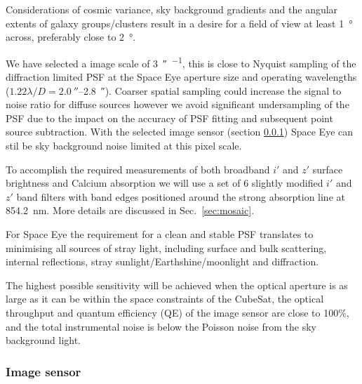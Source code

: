\documentclass[]{iac}
\begin{document}
Considerations of cosmic variance, sky background gradients and the angular extents of galaxy groups/clusters result in
a desire for a field of view at least \SI{1}{\degree} across, preferably close to \SI{2}{\degree}.

We have selected a image scale of \SI{3}{\arcsecond\per\pix}, this is close to Nyquist sampling of the diffraction
limited PSF at the Space Eye aperture size and operating wavelengths ($1.22 \lambda / D =
\SI{2.0}{\arcsecond}$--\SI{2.8}{\arcsecond}). Coarser spatial sampling could increase the signal to noise ratio for
diffuse sources however we avoid significant undersampling of the PSF due to the impact on the accuracy
of PSF fitting and subsequent point source subtraction. With the selected image sensor (section \ref{sec:imagesensor})
Space Eye can stil be sky background noise
limited at this pixel scale.

To accomplish the required measurements of both broadband $i'$ and $z'$ surface brightness and Calcium absorption we
will use a set of 6 slightly modified $i'$ and $z'$ band filters with band edges positioned around the strong
absorption line at \SI{854.2}{\nano\metre}. More details are discussed in Sec.~\ref{sec:mosaic}.

For Space Eye the requirement for a clean and stable PSF translates to minimising all sources of stray light, including
surface and bulk scattering, internal reflections, stray sunlight/Earthshine/moonlight and diffraction.

The highest possible sensitivity will be achieved when the optical aperture is as large as it can be within the space
constraints of the CubeSat, the optical throughput and quantum efficiency (QE) of the image sensor are close to 100\%,
and the total instrumental noise is below the Poisson noise from the sky background light.

\subsubsection{Image sensor}
\label{sec:imagesensor}
\end{document}
